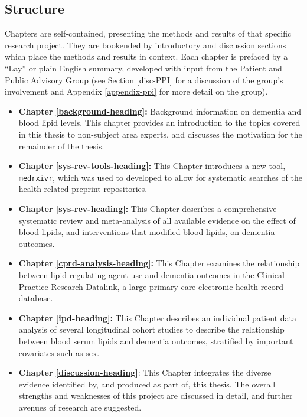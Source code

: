 \documentclass[a4paper, twoside]{templates/ociamthesis}
\providecommand{\tightlist}{%
  \setlength{\itemsep}{0pt}\setlength{\parskip}{0pt}}
\begin{document}
\hypertarget{thesis-structure}{%
\subsection{Structure}\label{thesis-structure}}

Chapters are self-contained, presenting the methods and results of that specific research project. They are bookended by introductory and discussion sections which place the methods and results in context. Each chapter is prefaced by a ``Lay'' or plain English summary, developed with input from the Patient and Public Advisory Group (see Section \ref{disc-PPI} for a discussion of the group's involvement and Appendix \ref{appendix-ppi} for more detail on the group).

\begin{itemize}
\tightlist
\item
  \textbf{Chapter \ref{background-heading}:} Background information on dementia and blood lipid levels. This chapter provides an introduction to the topics covered in this thesis to non-subject area experts, and discusses the motivation for the remainder of the thesis.
\item
  \textbf{Chapter \ref{sys-rev-tools-heading}:} This Chapter introduces a new tool, \texttt{medrxivr}, which was used to developed to allow for systematic searches of the health-related preprint repositories.
\item
  \textbf{Chapter \ref{sys-rev-heading}:} This Chapter describes a comprehensive systematic review and meta-analysis of all available evidence on the effect of blood lipids, and interventions that modified blood lipids, on dementia outcomes.
\item
  \textbf{Chapter \ref{cprd-analysis-heading}:} This Chapter examines the relationship between lipid-regulating agent use and dementia outcomes in the Clinical Practice Research Datalink, a large primary care electronic health record database.
\item
  \textbf{Chapter \ref{ipd-heading}:} This Chapter describes an individual patient data analysis of several longitudinal cohort studies to describe the relationship between blood serum lipids and dementia outcomes, stratified by important covariates such as sex.
\item
  \textbf{Chapter \ref{discussion-heading}}: This Chapter integrates the diverse evidence identified by, and produced as part of, this thesis. The overall strengths and weaknesses of this project are discussed in detail, and further avenues of research are suggested.
\end{itemize}
\end{document}
